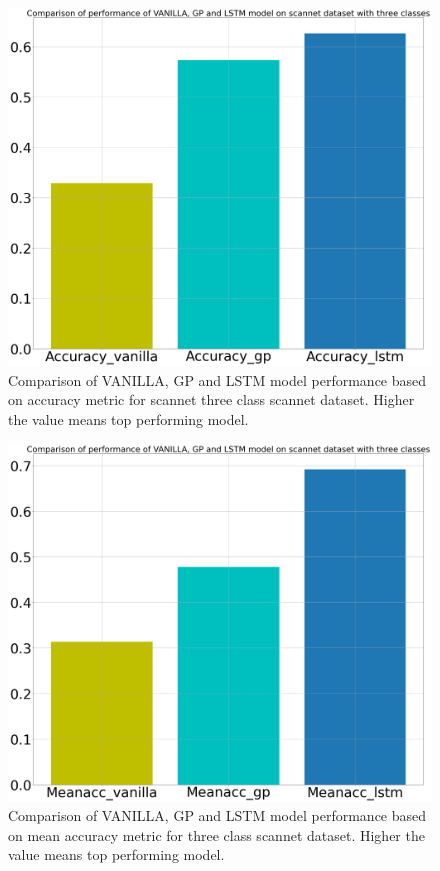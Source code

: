 	\begin{figure}
		\centering
		\includegraphics[width=12cm]{images/three_classes_acc.png}
		\caption{Comparison of VANILLA, GP and LSTM model performance based on accuracy metric for scannet three class scannet dataset. Higher the value means top performing model.}
		\label{fig:performance_metric_three_classes_unet}
	\end{figure}

	\begin{figure}
		\centering
		\includegraphics[width=12cm]{images/three_classes_meanacc.png}
		\caption{Comparison of VANILLA, GP and LSTM model performance based on mean accuracy metric for three class scannet dataset. Higher the value means top performing model.}
		\label{fig:performance_metric_three_classes_unet}
	\end{figure}

